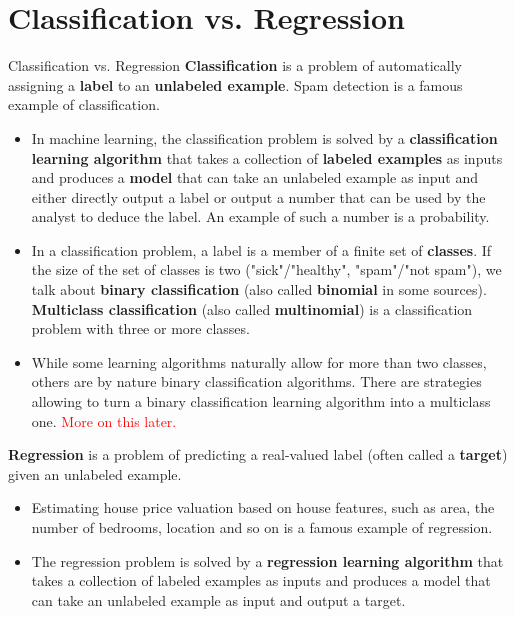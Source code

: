 \documentclass[9pt,dvipsnames]{beamer}
\begin{document}
\section{Classification vs. Regression}
\begin{frame}{Classification vs. Regression}
    \textbf{Classification} is a problem of automatically assigning a \textbf{label} to an \textbf{unlabeled example}. Spam detection is a famous example of classification.
    \begin{itemize}
        \item In machine learning, the classification problem is solved by a \textbf{classification learning algorithm} that takes a collection of \textbf{labeled examples} as inputs and produces a \textbf{model} that can take an unlabeled example as input and either directly output a label or output a number that can be used by the analyst to deduce the label. An example of such a number is a probability.
        \item In a classification problem, a label is a member of a finite set of \textbf{classes}. If the size of the set of classes is two ("sick"/"healthy", "spam"/"not spam"), we talk about \textbf{binary classification} (also called \textbf{binomial} in some sources). \textbf{Multiclass classification} (also called \textbf{multinomial}) is a classification problem with three or more classes.
        \item While some learning algorithms naturally allow for more than two classes, others are by nature binary classification algorithms. There are strategies allowing to turn a binary classification learning algorithm into a multiclass one. \textcolor{red}{More on this later.}
    \end{itemize}
\end{frame}
\begin{frame}
    \textbf{Regression} is a problem of predicting a real-valued label (often called a \textbf{target}) given an unlabeled example.
    \begin{itemize}
        \item Estimating house price valuation based on house features, such as area, the number of bedrooms, location and so on is a famous example of regression.
        \item The regression problem is solved by a \textbf{regression learning algorithm} that takes a collection of labeled examples as inputs and produces a model that can take an unlabeled example as input and output a target.
    \end{itemize}
\end{frame}
\end{document}
